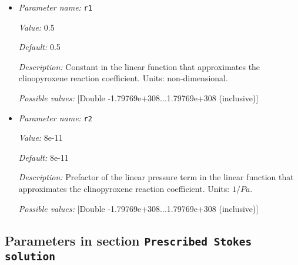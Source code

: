 \begin{itemize}
{\it Default:} 1.5


{\it Description:} Exponent of the melting temperature in the melt fraction calculation. Units: non-dimensional.


{\it Possible values:} [Double -1.79769e+308...1.79769e+308 (inclusive)]
\item {\it Parameter name:} {\tt r1}
\label{parameters:Postprocess/Visualization/Melt fraction/r1}


{\it Value:} 0.5


{\it Default:} 0.5


{\it Description:} Constant in the linear function that approximates the clinopyroxene reaction coefficient. Units: non-dimensional.


{\it Possible values:} [Double -1.79769e+308...1.79769e+308 (inclusive)]
\item {\it Parameter name:} {\tt r2}
\label{parameters:Postprocess/Visualization/Melt fraction/r2}


{\it Value:} 8e-11


{\it Default:} 8e-11


{\it Description:} Prefactor of the linear pressure term in the linear function that approximates the clinopyroxene reaction coefficient. Units: $1/Pa$.


{\it Possible values:} [Double -1.79769e+308...1.79769e+308 (inclusive)]
\end{itemize}

\subsection{Parameters in section \tt Prescribed Stokes solution}
\label{parameters:Prescribed_20Stokes_20solution}

